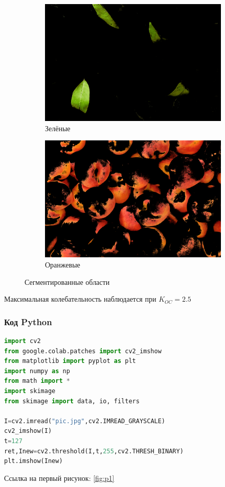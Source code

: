 \begin{figure}[!htbp]
\centering
\begin{subfigure}{.5\textwidth}
  \centering
  \includegraphics[width=0.8\linewidth]{assets/images/5.png}
  \caption{Зелёные}
  \label{fig:sub1}
\end{subfigure}%
\begin{subfigure}{.5\textwidth}
  \centering
  \includegraphics[width=0.8\linewidth]{assets/images/6.png}
  \caption{Оранжевые}
  \label{fig:sub2}
\end{subfigure}
\label{fig:test}
\caption{Сегментированные области}
\end{figure}

Максимальная колебательность наблюдается при $K_{OC} = 2.5$

\subsubsection{Код Python}

\begin{lstlisting}[language=Python, caption=Импорт и обычная бинаризация]
import cv2
from google.colab.patches import cv2_imshow
from matplotlib import pyplot as plt
import numpy as np
from math import *
import skimage
from skimage import data, io, filters

I=cv2.imread("pic.jpg",cv2.IMREAD_GRAYSCALE)
cv2_imshow(I)
t=127
ret,Inew=cv2.threshold(I,t,255,cv2.THRESH_BINARY)
plt.imshow(Inew)
\end{lstlisting}

Ссылка на первый рисунок: \ref{fig:p1}